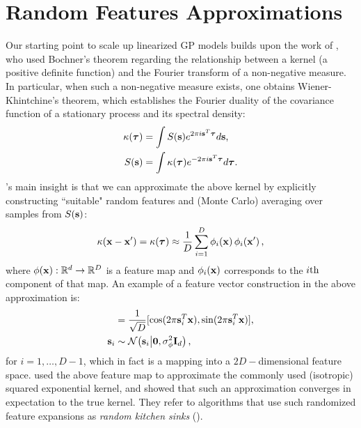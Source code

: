 \section{Random Features Approximations}
%
Our starting point to scale up linearized GP models builds upon the work of 
\citeauthor{rahimi-recht-nips-2007} \citeyearpar{rahimi-recht-nips-2007,rahimi-recht-nips-2008},  
who used Bochner's theorem regarding the relationship between 
a kernel (a positive definite function) and the Fourier transform of a non-negative measure. In particular, 
when such a non-negative measure exists, one obtains  Wiener-Khintchine's theorem, which establishes  
 the Fourier duality of the covariance function of a stationary  process and its spectral density:
\begin{align}
	\label{eq:fourier}
	\kappa(\boldsymbol{ \tau }) &= \int S(\mathbf{s}) e^{2 \pi i \mathbf{s}^T  \boldsymbol{ \tau } } d \mathbf{s} \text{,}  \\
	S(\mathbf{s}) &= \int \kappa(\boldsymbol{ \tau }) e^{- 2 \pi i \mathbf{s}^T \boldsymbol{ \tau } }  d \boldsymbol{ \tau } \text{.}
\end{align}
\citeauthor{rahimi-recht-nips-2007}'s  main insight  \citeyearpar{rahimi-recht-nips-2007} 
is that we can approximate the above kernel by explicitly constructing 
``suitable" random features and (Monte Carlo) averaging over samples from $S(\mathbf{s})$: 
\begin{equation}
	\label{eq:mcapprox}
	 \kappa(\mathbf{x}-\mathbf{x}^\prime) = \kappa(\boldsymbol{ \tau }) 
	\approx \frac{1}{D} \sum_{i=1}^{D} \phi_{i}\!\left({{\mathbf{x}}}\right) \phi_{i}\!\left({{\mathbf{x}^\prime}}\right)  \text{,}
\end{equation}
where $\phi\!\left({{\mathbf{x}}}\right): \mathbb{R}^{d} \to \mathbb{R}^{D}$ is a feature map and 
$\phi_{i}\!\left({{\mathbf{x}}}\right)$ corresponds to the $i\mathrm{th}$ component of that map.
%
An example of a feature vector construction in the above approximation is:
\begin{align}
	[\singlefeatfunc{\x}{i} ,\singlefeatfunc{\x}{i+1} ] &= \frac{1}{\sqrt{D}} [ \cos(2 \pi \ffourier_i^T \x) , \sin(2 \pi \ffourier_i^T \ins) ] \text{,}\\
		\ffourier_i & \sim \gausC{\ffourier_i}{\vec{0}, \varfeat \ident{d}} \text{,}
\end{align}
for $i=1, \ldots, D-1$,  which in fact is a mapping into a $2 D-$dimensional feature space. 
\citet{rahimi-recht-nips-2007} used the above feature map to approximate the commonly used 
(isotropic) squared exponential kernel, and showed that such an approximation
converges in expectation 
to the true kernel. They refer to algorithms that use such randomized feature expansions 
as \emph{random kitchen sinks} (\rks).  

